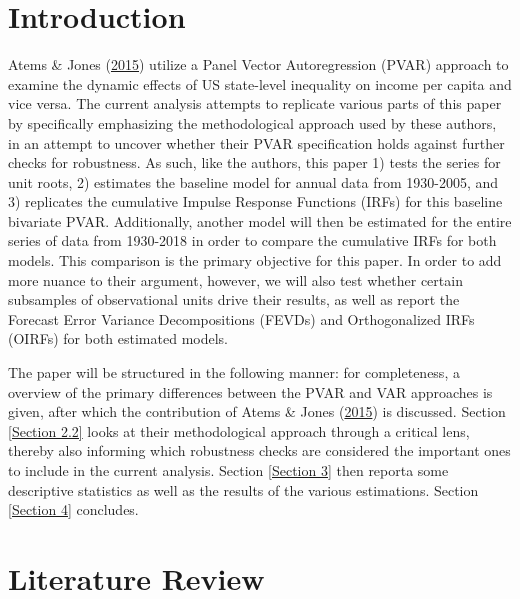 \documentclass[11pt,preprint, authoryear]{elsarticle}
\numberwithin{equation}{section}
\numberwithin{figure}{section}
\numberwithin{table}{section}
\begin{document}
\headsep 35pt %




\hypertarget{introduction}{%
\section{\texorpdfstring{Introduction
\label{Introduction}}{Introduction }}\label{introduction}}

Atems \& Jones (\protect\hyperlink{ref-atems}{2015}) utilize a Panel
Vector Autoregression (PVAR) approach to examine the dynamic effects of
US state-level inequality on income per capita and vice versa. The
current analysis attempts to replicate various parts of this paper by
specifically emphasizing the methodological approach used by these
authors, in an attempt to uncover whether their PVAR specification holds
against further checks for robustness. As such, like the authors, this
paper 1) tests the series for unit roots, 2) estimates the baseline
model for annual data from 1930-2005, and 3) replicates the cumulative
Impulse Response Functions (IRFs) for this baseline bivariate PVAR.
Additionally, another model will then be estimated for the entire series
of data from 1930-2018 in order to compare the cumulative IRFs for both
models. This comparison is the primary objective for this paper. In
order to add more nuance to their argument, however, we will also test
whether certain subsamples of observational units drive their results,
as well as report the Forecast Error Variance Decompositions (FEVDs) and
Orthogonalized IRFs (OIRFs) for both estimated models.

The paper will be structured in the following manner: for completeness,
a overview of the primary differences between the PVAR and VAR
approaches is given, after which the contribution of Atems \& Jones
(\protect\hyperlink{ref-atems}{2015}) is discussed. Section
\ref{Section 2.2} looks at their methodological approach through a
critical lens, thereby also informing which robustness checks are
considered the important ones to include in the current analysis.
Section \ref{Section 3} then reporta some descriptive statistics as well
as the results of the various estimations. Section \ref{Section 4}
concludes.

\hypertarget{literature-review}{%
\section{\texorpdfstring{Literature Review
\label{Section 2}}{Literature Review }}\label{literature-review}}
\end{document}
